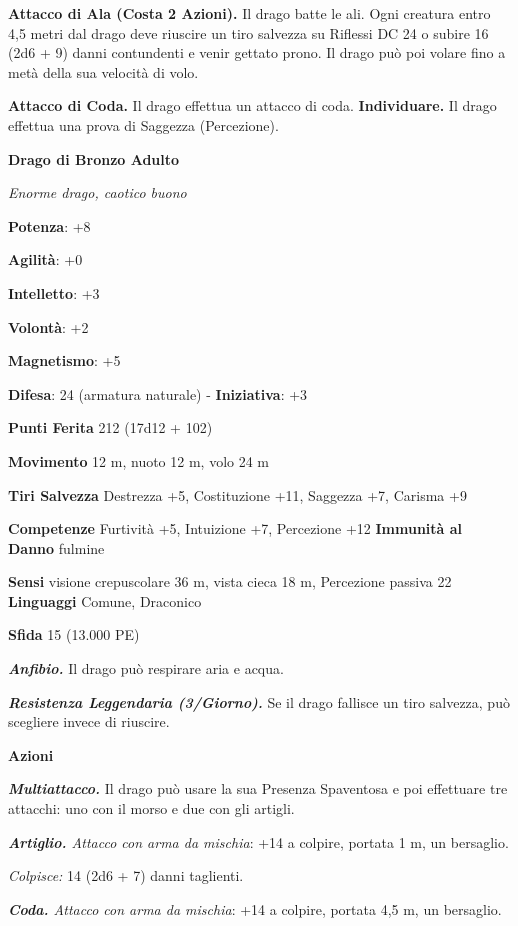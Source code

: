 \begin{multicols}{2}
\textbf{Attacco di Ala (Costa 2 Azioni).} Il drago batte le ali. Ogni
creatura entro 4,5 metri dal drago deve riuscire un tiro salvezza su Riflessi DC 24 o subire 16 (2d6 + 9) danni contundenti e venir gettato
prono. Il drago può poi volare fino a metà della sua velocità di volo.

\textbf{Attacco di Coda.} Il drago effettua un attacco di coda.
\textbf{Individuare.} Il drago effettua una prova di Saggezza
(Percezione).

\textbf{Drago di Bronzo Adulto}

\emph{Enorme drago, caotico buono}

\textbf{Potenza}: +8

\textbf{Agilità}: +0

\textbf{Intelletto}: +3

\textbf{Volontà}: +2

\textbf{Magnetismo}: +5

\textbf{Difesa}: 24 (armatura naturale) - \textbf{Iniziativa}: +3

\textbf{Punti Ferita} 212 (17d12 + 102)

\textbf{Movimento} 12 m, nuoto 12 m, volo 24 m

\textbf{Tiri Salvezza} Destrezza +5, Costituzione +11, Saggezza +7,
Carisma +9

\textbf{Competenze} Furtività +5, Intuizione +7, Percezione +12
\textbf{Immunità al Danno} fulmine

\textbf{Sensi} visione crepuscolare 36 m, vista cieca 18 m, Percezione passiva
22 \textbf{Linguaggi} Comune, Draconico

\textbf{Sfida} 15 (13.000 PE)\smallskip

\emph{\textbf{Anfibio.}} Il drago può respirare aria e acqua.

\emph{\textbf{Resistenza Leggendaria (3/Giorno).}} Se il drago fallisce
un tiro salvezza, può scegliere invece di riuscire.

\smallskip\textbf{Azioni}

\emph{\textbf{Multiattacco.}} Il drago può usare la sua Presenza
Spaventosa e poi effettuare tre attacchi: uno con il morso e due con gli
artigli.

\emph{\textbf{Artiglio.} Attacco con arma da mischia}: +14 a colpire,
portata 1 m, un bersaglio.

\emph{Colpisce:} 14 (2d6 + 7) danni taglienti.

\emph{\textbf{Coda.} Attacco con arma da mischia}: +14 a colpire,
portata 4,5 m, un bersaglio.


\end{multicols}
